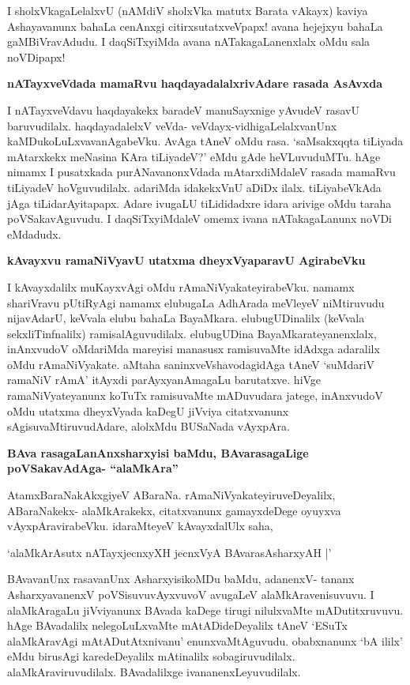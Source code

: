 I sholxVkagaLelalxvU (nAMdiV sholxVka matutx Barata vAkayx) kaviya Ashayavanunx bahaLa cenAnxgi citirxsutatxveVpapx! avana hejejxyu bahaLa gaMBiVravAdudu. I daqSiTxyiMda avana nATakagaLanenxlalx oMdu sala noVDipapx!

{\bigskip
\noindent
{\large\bf nATayxveVdada mamaRvu haqdayadalalxrivAdare rasada AsAvxda}}\label{page244}
\medskip

\noindent
I nATayxveVdavu haqdayakekx baradeV manuSayxnige yAvudeV rasavU baruvudilalx. haqdayadalelxV veVda- veVdayx-vidhigaLelalxvanUnx kaMDukoLuLxvavanAgabeVku. AvAga tAneV oMdu rasa. `saMsakxqqta tiLiyada mAtarxkekx meNasina KAra tiLiyadeV?' eMdu gAde heVLuvuduMTu. hAge nimamx I pusatxkada purANavanonxVdada mAtarxdiMdaleV rasada mamaRvu tiLiyadeV hoVguvudilalx. adariMda idakekxVnU aDiDx ilalx. tiLiyabeVkAda jAga tiLidarAyitapapx. Adare ivugaLU tiLididadxre idara arivige oMdu taraha poVSakavAguvudu. I daqSiTxyiMdaleV omemx ivana nATakagaLanunx noVDi eMdadudx.


{\bigskip
\noindent
{\large\bf kAvayxvu ramaNiVyavU utatxma dheyxVyaparavU AgirabeVku}}\label{page244a}
\medskip

\noindent
I kAvayxdalilx muKayxvAgi oMdu rAmaNiVyakateyirabeVku. namamx shariVravu pUtiRyAgi namamx elubugaLa AdhArada meVleyeV niMtiruvudu nijavAdarU, keVvala elubu bahaLa BayaMkara. elubugUDinalilx (keVvala sekxliTinfnalilx) ramisalAguvudilalx. elubugUDina BayaMkarateyanenxlalx, inAnxvudoV oMdariMda mareyisi manasusx ramisuvaMte idAdxga adaralilx oMdu rAmaNiVyakate. aMtaha saninxveVshavodagidAga tAneV `suMdariV ramaNiV rAmA' itAyxdi parAyxyanAmagaLu barutatxve. hiVge ramaNiVyateyanunx koTuTx ramisuvaMte mADuvudara jatege, inAnxvudoV oMdu utatxma dheyxVyada kaDegU jiVviya citatxvanunx sAgisuvaMtiruvudAdare, alolxMdu BUSaNada vAyxpAra.

{\bigskip
\noindent
{\large\bf BAva rasagaLanAnxsharxyisi baMdu, BAvarasagaLige poVSakavAdAga- ``alaMkAra''}}\label{page245}
\medskip

\noindent
AtamxBaraNakAkxgiyeV ABaraNa. rAmaNiVyakateyiruveDeyalilx, ABaraNakekx- alaMkArakekx, citatxvanunx gamayxdeDege oyuyxva vAyxpAravirabeVku. idaraMteyeV kAvayxdalUlx saha, 

\begin{shloka}
`alaMkArAsutx nATayxjecnxyXH jecnxVyA BAvarasAsharxyAH |'\label{245}
\end{shloka}

BAvavanUnx rasavanUnx AsharxyisikoMDu baMdu, adanenxV- tananx AsharxyavanenxV poVSisuvuvAyxvuvoV avugaLeV alaMkAravenisuvuvu. I alaMkAragaLu jiVviyanunx BAvada kaDege tirugi nilulxvaMte mADutitxruvuvu. hAge BAvadalilx nelegoLuLxvaMte mAtADideDeyalilx tAneV `ESuTx alaMkAravAgi mAtADutAtxnivanu' enunxvaMtAguvudu. obabxnanunx `bA ililx' eMdu birusAgi karedeDeyalilx mAtinalilx sobagiruvudilalx. alaMkAraviruvudilalx. BAvadalilxge ivananenxLeyuvudilalx.

